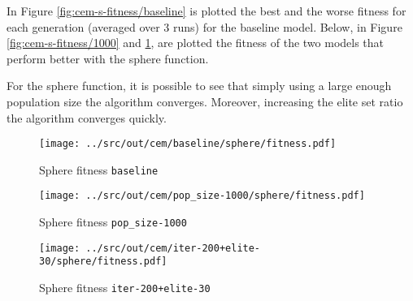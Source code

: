 In Figure \ref{fig:cem-s-fitness/baseline} is plotted the best and the worse fitness for each generation (averaged over 3 runs) for the baseline model. Below, in Figure \ref{fig:cem-s-fitness/1000} and \ref{fig:cem-s-fitness/200}, are plotted the fitness of the two models that perform better with the sphere function.

For the sphere function, it is possible to see that simply using a large enough population size the algorithm converges. 
Moreover, increasing the elite set ratio the algorithm converges quickly.
 
 \begin{figure}[H]
 	\centering
 	\begin{minipage}[b]{.6\textwidth}
 		\texttt{[image: ../src/out/cem/baseline/sphere/fitness.pdf]}	
 	\end{minipage}
	 \caption{Sphere fitness \texttt{baseline}}
	 \label{fig:cem-s-fitness/baseline}
	 
	 \begin{minipage}[b]{.6\textwidth}
	 	\texttt{[image: ../src/out/cem/pop\_size-1000/sphere/fitness.pdf]}	
	 \end{minipage}
	 \caption{Sphere fitness \texttt{pop\_size-1000}}
	 \label{fig:cem-s-fitness/1000}
	 
	 \begin{minipage}[b]{.6\textwidth}
	 	\texttt{[image: ../src/out/cem/iter-200+elite-30/sphere/fitness.pdf]}	
	 \end{minipage}
	 \caption{Sphere fitness \texttt{iter-200+elite-30}}
	 \label{fig:cem-s-fitness/200}
\end{figure}


